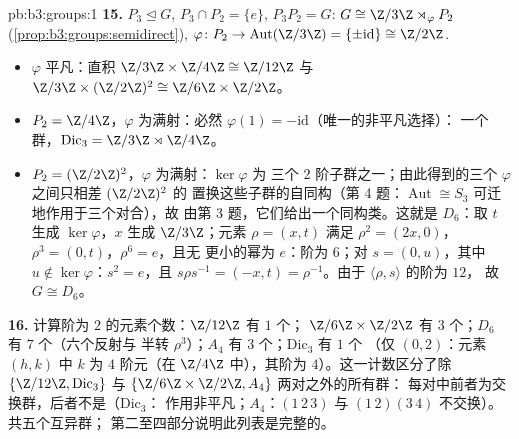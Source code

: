\begin{solution}{pb:b3:groups:1}
\textbf{15.} $P_3 \trianglelefteq G$, $P_3 \cap P_2 = \{e\}$,
$P_3P_2 = G$: $G \cong \Z/3\Z \rtimes_\varphi P_2$
(\cref{prop:b3:groups:semidirect}), $\varphi \colon P_2 \to
\operatorname{Aut}(\Z/3\Z) = \{\pm\mathrm{id}\} \cong \Z/2\Z$.
\begin{itemize}
  \item $\varphi$ 平凡：直积 $\Z/3\Z \times \Z/4\Z
        \cong \Z/12\Z$ 与 $\Z/3\Z \times (\Z/2\Z)^2 \cong \Z/6\Z
        \times \Z/2\Z$。
  \item $P_2 = \Z/4\Z$，$\varphi$ 为满射：必然
        $\varphi(1) = -\mathrm{id}$（唯一的非平凡选择）：
        一个群，$\mathrm{Dic}_3 = \Z/3\Z \rtimes \Z/4\Z$。
  \item $P_2 = (\Z/2\Z)^2$，$\varphi$ 为满射：$\ker\varphi$ 为
        三个 $2$ 阶子群之一；由此得到的三个
        $\varphi$ 之间只相差 $(\Z/2\Z)^2$ 的
        置换这些子群的自同构（第 4 题：$\operatorname{Aut}
        \cong S_3$ 可迁地作用于三个对合），故
        由第 3 题，它们给出一个同构类。这就是
        $D_6$：取 $t$ 生成 $\ker\varphi$，$x$
        生成 $\Z/3\Z$；元素 $\rho = (x, t)$ 满足
        $\rho^2 = (2x, 0)$，$\rho^3 = (0, t)$，$\rho^6 = e$，且无
        更小的幂为 $e$：阶为 $6$；对 $s = (0, u)$，其中 $u
        \notin \ker\varphi$：$s^2 = e$，且 $s\rho s^{-1} = (-x, t)
        = \rho^{-1}$。由于 $\langle \rho, s\rangle$ 的阶为 $12$，
        故 $G \cong D_6$。
\end{itemize}

\textbf{16.} 计算阶为 $2$ 的元素个数：$\Z/12\Z$ 有 $1$ 个；
$\Z/6\Z\times\Z/2\Z$ 有 $3$ 个；$D_6$ 有 $7$ 个（六个反射与
半转 $\rho^3$）；$A_4$ 有 $3$ 个；$\mathrm{Dic}_3$ 有 $1$ 个
（仅 $(0, 2)$：元素 $(h, k)$ 中 $k$ 为 $4$ 阶元（在
$\Z/4\Z$ 中），其阶为 $4$）。这一计数区分了除
$\{\Z/12\Z, \mathrm{Dic}_3\}$ 与 $\{\Z/6\Z\times\Z/2\Z, A_4\}$ 两对之外的所有群：
每对中前者为交换群，后者不是（$\mathrm{Dic}_3$：
作用非平凡；$A_4$：$(1\,2\,3)$ 与
$(1\,2)(3\,4)$ 不交换）。共五个互异群；
第二至四部分说明此列表是完整的。


\end{solution}
